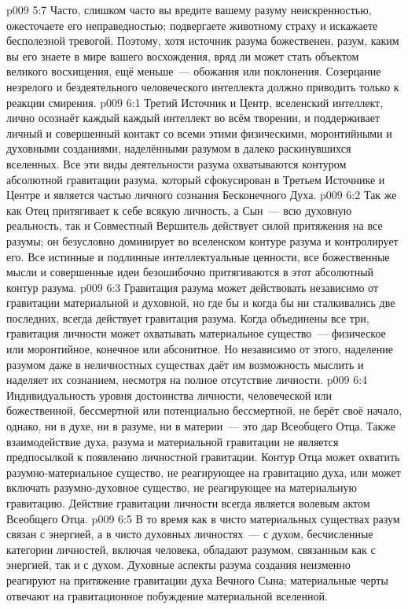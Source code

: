 \vs p009 5:7 Часто, слишком часто вы вредите вашему разуму неискренностью, ожесточаете его неправедностью; подвергаете животному страху и искажаете бесполезной тревогой. Поэтому, хотя источник разума божественен, разум, каким вы его знаете в мире вашего восхождения, вряд ли может стать объектом великого восхищения, ещё меньше~--- обожания или поклонения. Созерцание незрелого и бездеятельного человеческого интеллекта должно приводить только к реакции смирения.
\vs p009 6:1 Третий Источник и Центр, вселенский интеллект, лично осознаёт каждый  каждый интеллект во всём творении, и поддерживает личный и совершенный контакт со всеми этими физическими, моронтийными и духовными созданиями, наделёнными разумом в далеко раскинувшихся вселенных. Все эти виды деятельности разума охватываются контуром абсолютной гравитации разума, который сфокусирован в Третьем Источнике и Центре и является частью личного сознания Бесконечного Духа.
\vs p009 6:2 Так же как Отец притягивает к себе всякую личность, а Сын~--- всю духовную реальность, так и Совместный Вершитель действует силой притяжения на все разумы; он безусловно доминирует во вселенском контуре разума и контролирует его. Все истинные и подлинные интеллектуальные ценности, все божественные мысли и совершенные идеи безошибочно притягиваются в этот абсолютный контур разума.
\vs p009 6:3 \pc Гравитация разума может действовать независимо от гравитации материальной и духовной, но где бы и когда бы ни сталкивались две последних, всегда действует гравитация разума. Когда объединены все три, гравитация личности может охватывать материальное существо~--- физическое или моронтийное, конечное или абсонитное. Но независимо от этого, наделение разумом даже в неличностных существах даёт им возможность мыслить и наделяет их сознанием, несмотря на полное отсутствие личности.
\vs p009 6:4 \pc Индивидуальность уровня достоинства личности, человеческой или божественной, бессмертной или потенциально бессмертной, не берёт своё начало, однако, ни в духе, ни в разуме, ни в материи~--- это дар Всеобщего Отца. Также взаимодействие духа, разума и материальной гравитации не является предпосылкой к появлению личностной гравитации. Контур Отца может охватить разумно\hyp{}материальное существо, не реагирующее на гравитацию духа, или может включать разумно\hyp{}духовное существо, не реагирующее на материальную гравитацию. Действие гравитации личности всегда является волевым актом Всеобщего Отца.
\vs p009 6:5 В то время как в чисто материальных существах разум связан с энергией, а в чисто духовных личностях~--- с духом, бесчисленные категории личностей, включая человека, обладают разумом, связанным как с энергией, так и с духом. Духовные аспекты разума создания неизменно реагируют на притяжение гравитации духа Вечного Сына; материальные черты отвечают на гравитационное побуждение материальной вселенной.

